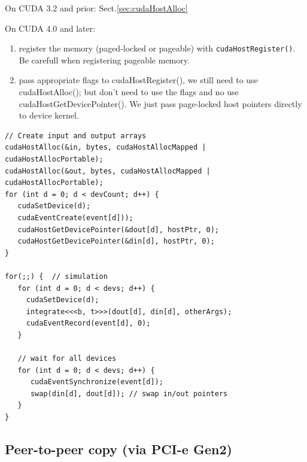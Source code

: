 On CUDA 3.2 and prior: Sect.\ref{sec:cudaHostAlloc}

On CUDA 4.0 and later:
\begin{enumerate}
  \item register the memory (paged-locked or pageable)
  with \verb!cudaHostRegister()!. Be carefull when registering pageable memory.
  \item pass appropriate flags to cudaHostRegister(), we still need to use
  cudaHostAlloc(); but don't need to use the flags and no use
  cudaHostGetDevicePointer(). We just pass page-locked host pointers directly to
  device kernel.
\end{enumerate}


\begin{lstlisting}
// Create input and output arrays
cudaHostAlloc(&in, bytes, cudaHostAllocMapped |
cudaHostAllocPortable);
cudaHostAlloc(&out, bytes, cudaHostAllocMapped | 
cudaHostAllocPortable);
for (int d = 0; d < devCount; d++) {
   cudaSetDevice(d);
   cudaEventCreate(event[d]));
   cudaHostGetDevicePointer(&dout[d], hostPtr, 0);
   cudaHostGetDevicePointer(&din[d], hostPtr, 0);
}

for(;;) {  // simulation
   for (int d = 0; d < devs; d++) {
     cudaSetDevice(d);
     integrate<<<b, t>>>(dout[d], din[d], otherArgs);
     cudaEventRecord(event[d], 0);
   }
   
   // wait for all devices
   for (int d = 0; d < devs; d++) {
      cudaEventSynchronize(event[d]);
      swap(din[d], dout[d]); // swap in/out pointers
   }
}
\end{lstlisting}


\subsection{Peer-to-peer copy (via PCI-e Gen2)}
\label{sec:CUDA4_peer2peer-copy}

